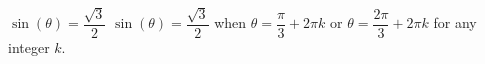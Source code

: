 {$\sin(\theta) = \dfrac{\sqrt{3}}{2}$}
{$\sin(\theta) = \dfrac{\sqrt{3}}{2}$ when $\theta = \dfrac{\pi}{3} + 2\pi k$ or $\theta = \dfrac{2\pi}{3} + 2\pi k$ for any integer $k$.}
